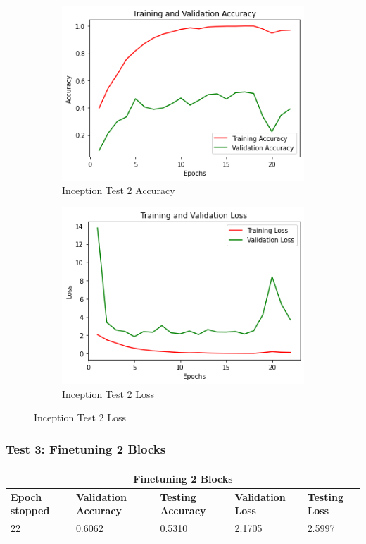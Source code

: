 \begin{figure}[H]
	\begin{subfigure}{0.5\textwidth}
		\includegraphics[width=0.9\linewidth]{img/inception/inceptionft1acc.png} 
		\caption{Inception Test 2 Accuracy}
		\label{fig:inceptionft1acc}
	\end{subfigure}
	\begin{subfigure}{0.5\textwidth}
		\includegraphics[width=0.9\linewidth]{img/inception/inceptionft1loss.png}
		\caption{Inception Test 2 Loss}
		\label{fig:inceptionft1loss}
	\end{subfigure}
\end{figure}

\subsubsection{Test 3: Finetuning 2 Blocks}
\begin{tabular}{ |p{2cm}|p{2cm}|p{2cm}|p{2cm}|p{2cm}|  }
\hline
\multicolumn{5}{|c|}{Finetuning 2 Blocks} \\
\hline
\textbf{Epoch stopped} & \textbf{Validation Accuracy} & \textbf{Testing Accuracy} & \textbf{Validation Loss} & \textbf{Testing Loss} \\
\hline
22 & 0.6062 & 0.5310 & 2.1705 & 2.5997\\
\hline
\end{tabular}

